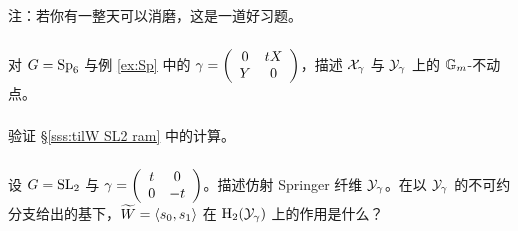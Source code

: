 注：若你有一整天可以消磨，这是一道好习题。

\subsubsection{} 对 $G=\textup{Sp}_{6}$ 与例 \ref{ex:Sp} 中的 $\gamma=\left(\begin{array}{cc} 0 & tX \\ Y & 0 \end{array}\right)$，描述 $\mathcal{X}_{\gamma}$ 与 $\mathcal{Y}_{\gamma}$ 上的 $\mathbb{G}_m$-不动点。

\subsubsection{} 验证 \S\ref{sss:tilW SL2 ram} 中的计算。

\subsubsection{} 设 $G=\textup{SL}_{2}$ 与 $\gamma=\left(\begin{array}{cc} t & 0 \\ 0 & -t \end{array}\right)$。描述仿射 Springer 纤维 $\mathcal{Y}_{\gamma}$。在以 $\mathcal{Y}_{\gamma}$ 的不可约分支给出的基下，$\widetilde{W}=\langle{s_{0},s_{1}}\rangle$ 在 $\textup{H}_{2}({\mathcal{Y}_{\gamma}})$ 上的作用是什么？
